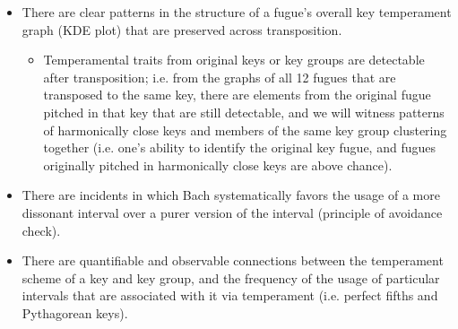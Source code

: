 \begin{itemize}
\tightlist
\item
  There are clear patterns in the structure of a fugue's overall key
  temperament graph (KDE plot) that are preserved across transposition.

  \begin{itemize}
  \tightlist
  \item
    Temperamental traits from original keys or key groups are detectable
    after transposition; i.e. from the graphs of all 12 fugues that are
    transposed to the same key, there are elements from the original
    fugue pitched in that key that are still detectable, and we will
    witness patterns of harmonically close keys and members of the same
    key group clustering together (i.e. one's ability to identify the
    original key fugue, and fugues originally pitched in harmonically
    close keys are above chance).
  \end{itemize}
\item
  There are incidents in which Bach systematically favors the usage of a
  more dissonant interval over a purer version of the interval
  (principle of avoidance check).
\item
  There are quantifiable and observable connections between the
  temperament scheme of a key and key group, and the frequency of the
  usage of particular intervals that are associated with it via
  temperament (i.e. perfect fifths and Pythagorean keys).


\end{itemize}

